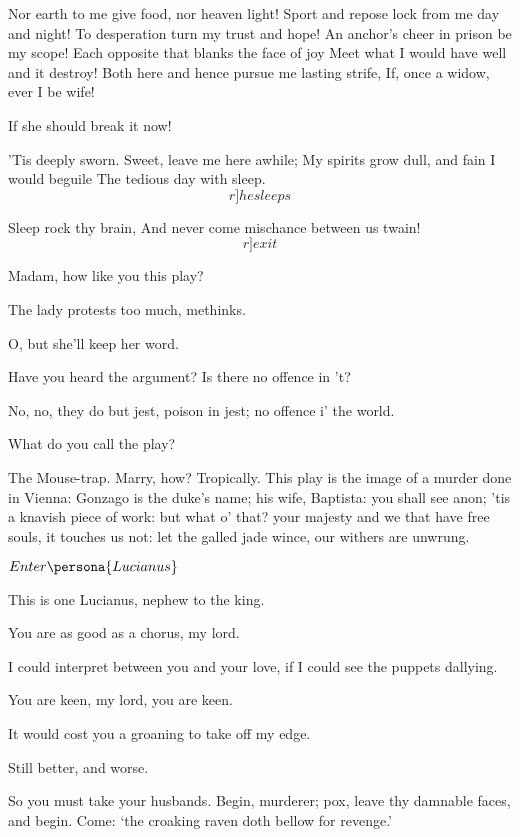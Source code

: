 \documentclass[11pt]{book}
\begin{document}
	   Nor earth to me give food, nor heaven light!
	Sport and repose lock from me day and night!
	To desperation turn my trust and hope!
	An anchor's cheer in prison be my scope!
	Each opposite that blanks the face of joy
	Meet what I would have well and it destroy!
	Both here and hence pursue me lasting strife,
	If, once a widow, ever I be wife!

\1	If she should break it now!

	'Tis deeply sworn. Sweet, leave me here awhile;
	My spirits grow dull, and fain I would beguile
	The tedious day with sleep.  \\	\[r]he sleeps\]

	Sleep rock thy brain,
	And never come mischance between us twain! \[r]exit\]

\endVersus

\1	Madam, how like you this play?

\3	The lady protests too much, methinks.

\1	O, but she'll keep her word.

\2	Have you heard the argument? Is there no offence in 't?

\1	No, no, they do but jest, poison in jest; no offence
	i' the world.

\2	What do you call the play?

\1	The Mouse-trap. Marry, how? Tropically. This play
	is the image of a murder done in Vienna: Gonzago is
	the duke's name; his wife, Baptista: you shall see
	anon; 'tis a knavish piece of work: but what o'
	that? your majesty and we that have free souls, it
	touches us not: let the galled jade wince, our
	withers are unwrung.

	\(Enter \persona{Lucianus}\)

	This is one Lucianus, nephew to the king.

\4	You are as good as a chorus, my lord.

\1	I could interpret between you and your love, if I
	could see the puppets dallying.

\4	You are keen, my lord, you are keen.

\1	It would cost you a groaning to take off my edge.

\4	Still better, and worse.

\1	So you must take your husbands. Begin, murderer;
	pox, leave thy damnable faces, and begin. Come:
	`the croaking raven doth bellow for revenge.'
\end{document}
